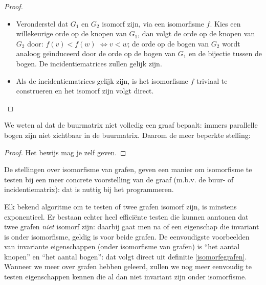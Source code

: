 \begin{proof}
\begin{itemize}
\item 
Veronderstel dat $G_{1}$ en $G_{2}$ isomorf zijn, via een isomorfisme $f$.
Kies een willekeurige orde op de knopen
  van $G_{1}$, dan volgt de orde op de knopen van $G_{2}$ door: $f(v)
  < f(w)$ $\Leftrightarrow v < w$; de orde op de bogen van $G_{2}$
  wordt analoog ge\"{\i}nduceerd door 
de orde op de bogen
van $G_{1}$ en 
  de bijectie tussen de bogen. De incidentiematrices zullen gelijk
  zijn.
\item Als de incidentiematrices gelijk zijn, is het isomorfisme $f$
  triviaal te construeren en 
het isomorf zijn
volgt direct.
\end{itemize}
\end{proof}

We weten al dat de buurmatrix niet volledig een graaf bepaalt: immers
parallelle bogen zijn niet zichtbaar in de buurmatrix. Daarom de meer
beperkte stelling:

\begin{proof} Het bewijs mag je zelf geven.
\end{proof}



De stellingen over isomorfisme van grafen, geven een manier om
isomorfisme te testen bij een meer concrete voorstelling van de graaf
(m.b.v. de buur- of incidentiematrix): dat is nuttig bij het programmeren.


Elk bekend algoritme om te testen of twee grafen isomorf zijn, is
minstens exponentieel. Er bestaan echter heel effici\"ente testen die
kunnen aantonen dat twee grafen {\em niet} isomorf zijn: daarbij gaat
men na of een eigenschap die invariant is onder isomorfisme, geldig is
voor beide grafen. De eenvoudigste voorbeelden van invariante
eigenschappen (onder isomorfisme van grafen) is ``het aantal knopen''
en ``het aantal bogen'': dat volgt direct uit definitie
\ref{isomorfegrafen}. Wanneer we meer over grafen hebben geleerd,
zullen we nog meer eenvoudig te testen eigenschappen kennen die al dan
niet invariant zijn onder isomorfisme.



